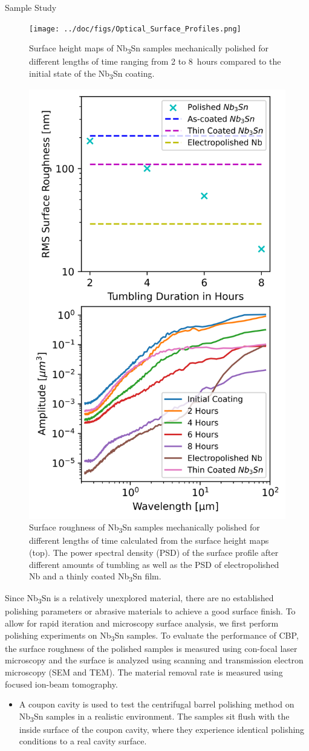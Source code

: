 \documentclass{beamer}
\begin{document}
\begin{frame}{}
\begin{columns}[t]
\begin{column}{0.32\linewidth}
\begin{block}{\label{sec:samplestudy}Sample Study}
\begin{figure}
                        \centering
                        \texttt{[image: ../doc/figs/Optical\_Surface\_Profiles.png]}
                        \caption{\label{fig:opticalsurfaceprofiles}Surface height maps of Nb\textsubscript{3}Sn samples mechanically polished for different lengths of time ranging from 2 to 8~hours compared to the initial state of the Nb\textsubscript{3}Sn coating.}
                        \includegraphics[width=0.3\columnwidth]{../doc/figs/Surface_Roughness_Graph.png}
                        \caption{\label{fig:surfaceroughnessgraph}Surface roughness of Nb\textsubscript{3}Sn samples mechanically polished for different lengths of time calculated from the surface height maps (top). The power spectral density (PSD) of the surface profile after different amounts of tumbling as well as the PSD of electropolished Nb and a thinly coated Nb\textsubscript{3}Sn film.}
                    \end{figure}
                    Since Nb\textsubscript{3}Sn is a relatively unexplored material, there are no established polishing parameters or abrasive materials to achieve a good surface finish. To allow for rapid iteration and microscopy surface analysis, we first perform polishing experiments on Nb\textsubscript{3}Sn samples. To evaluate the performance of CBP, the surface roughness of the polished samples is measured using con-focal laser microscopy and the surface is analyzed using scanning and transmission electron microscopy (SEM and TEM). The material removal rate is measured using focused ion-beam tomography.
                    \begin{itemize}                        
                        \item A coupon cavity is used to test the centrifugal barrel polishing method on Nb\textsubscript{3}Sn samples in a realistic environment. The samples sit flush with the inside surface of the coupon cavity, where they experience identical polishing conditions to a real cavity surface.

\end{itemize}
\end{block}
\end{column}
\end{columns}
\end{frame}
\end{document}
